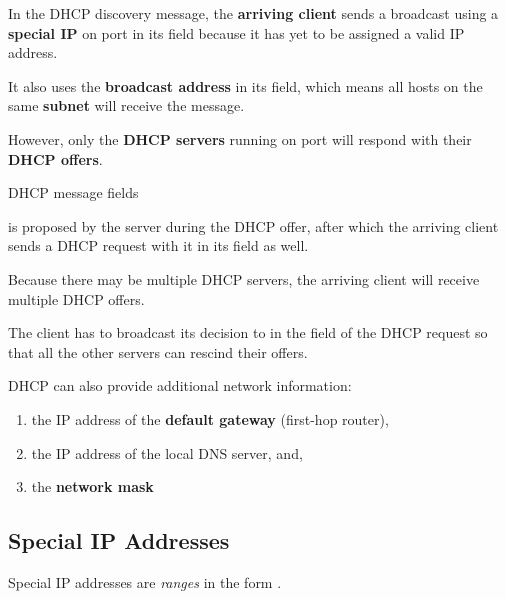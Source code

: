 In the DHCP discovery message, the \textbf{arriving client} sends a broadcast using a \textbf{special IP} 
on port  in its  field because it has yet to be assigned a valid IP address.

It also uses the \textbf{broadcast address}  in its  field,
which means all hosts on the same \textbf{subnet} will receive the message.

However, only the \textbf{DHCP servers} running on port  will respond with their \textbf{DHCP offers}.

\begin{defn}{DHCP message fields}
    \vspace{0.75em}
    \begin{enumerate}
    \end{enumerate}
\end{defn}

 is proposed by the server during the DHCP offer, after which the arriving client
sends a DHCP request with it in its  field as well.

Because there may be multiple DHCP servers, the arriving client will receive multiple DHCP offers.

The client has to broadcast its decision to  in the  field of the DHCP request
so that all the other servers can rescind their offers.

DHCP can also provide additional network information:
\begin{enumerate}
    \item the IP address of the \textbf{default gateway} (first-hop router),
    \item the IP address of the local DNS server, and,
    \item the \textbf{network mask} 
\end{enumerate}

\subsection{Special IP Addresses}
Special IP addresses are \textit{ranges} in the form .

